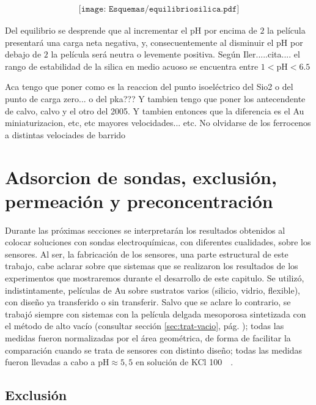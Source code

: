 				\begin{equation}
				\begin{aligned}
				\texttt{[image: Esquemas/equilibriosilica.pdf]}
				\label{eq:equilibriosilica}
				\end{aligned}
				\end{equation}

	Del equilibrio se desprende que al incrementar el pH por encima de $2$ la película presentará una carga neta negativa, y, consecuentemente al disminuir el pH por debajo de $2$ la película será neutra o levemente positiva. Según Iler.....cita.... el rango de estabilidad de la silica en medio acuoso se encuentra entre $1<\text{pH}<6.5$ 
				
	Aca tengo que poner como es la reaccion del punto isoeléctrico del Sio2 o del punto de carga zero... o del pka??? Y tambien tengo que poner los antecendente de calvo, calvo y el otro del 2005. Y tambien entonces que la diferencia es el Au miniaturizacion, etc, etc mayores velocidades... etc. 
	No olvidarse de los ferrocenos a distintas velociades de barrido
	

\section{Adsorcion de sondas, exclusión, permeación y preconcentración}

	Durante las próximas secciones se interpretarán los resultados obtenidos al colocar soluciones con sondas electroquímicas, con diferentes cualidades, sobre los sensores. Al ser,  la fabricación de los sensores, una parte estructural de este trabajo, cabe aclarar sobre que sistemas que se realizaron los resultados de los experimentos que mostraremos durante el desarrollo de este capitulo. Se utilizó, indistintamente, películas de Au sobre sustratos varios (silicio, vidrio, flexible), con diseño ya transferido o sin transferir. Salvo que se aclare lo contrario, se trabajó siempre con sistemas con la película delgada mesoporosa sintetizada con el método de alto vacío (consultar sección \ref{sec:trat-vacio}, pág. \pageref{sec:trat-vacio}); todas las medidas fueron normalizadas por el área geométrica, de forma de facilitar la comparación cuando se trata de sensores con distinto diseño; todas las medidas fueron llevadas a cabo a pH$\approx 5,5$ en solución de KCl \SI{100}{\milli\Molar}.

	\subsection{Exclusión}

